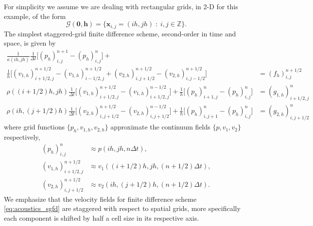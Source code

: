 For simplicity we assume we are dealing with rectangular grids, in 2-D for this example, of the form
\[
	\mathcal G(\mathbf 0,\mathbf h) = \{ \mathbf x_{i,j} = (ih,jh) \; : \; i,j\in\mathbb Z \}.
\]
The simplest staggered-grid finite difference scheme, second-order in time and space, is given by
\begin{equation}\label{eq:acoustics_sgfd}
\begin{split}
	\frac{1}{\kappa(ih,jh)} \frac{1}{\Delta t} \Big[  (p_h)^{n+1}_{i,j} - (p_h)^{n}_{i,j} \Big] + \hspace{7cm}\\
	\frac{1}{h} \Big[ (v_{1,h})_{i+1/2,j}^{n+1/2} - (v_{1,h})_{i-1/2,j}^{n+1/2} + 
				(v_{2,h})_{i,j+1/2}^{n+1/2} - (v_{2,h})_{i,j-1/2}^{n+1/2} \Big] 
		&= (f_h)^{n+1/2}_{i,j}\\
	\rho((i+1/2)h,jh) \frac{1}{\Delta t} \Big[ (v_{1,h})^{n+1/2}_{i+1/2,j} - (v_{1,h})^{n-1/2}_{i+1/2,j} \Big] +
	\frac{1}{h} \Big[ (p_h)_{i+1,j}^{n} - (p_h)_{i,j}^{n} \Big] 
		&= (g_{1,h})_{i+1/2,j}^{n}\\
	\rho(ih,(j+1/2)h) \frac{1}{\Delta t} \Big[ (v_{2,h})^{n+1/2}_{i,j+1/2} - (v_{2,h})^{n-1/2}_{i,j+1/2} \Big] +
	\frac{1}{h} \Big[ (p_h)_{i,j+1}^{n} - (p_h)_{i,j}^{n} \Big] 
		&= (g_{2,h})_{i,j+1/2}^{n}
\end{split}
\end{equation}
where grid functions $\{p_h,v_{1,h},v_{2,h}\}$ approximate the continuum fields $\{p,v_1,v_2\}$ respectively, %
\begin{equation*}
\begin{split}
	(p_h)_{i,j}^{n} &\approx p(ih,jh,n\Delta t), \\
	(v_{1,h})_{i+1/2,j}^{n+1/2} &\approx v_1((i+1/2)h,jh,(n+1/2)\Delta t),\\
	(v_{2,h})_{i,j+1/2}^{n+1/2} &\approx v_2(ih,(j+1/2)h,(n+1/2)\Delta t).
\end{split}
\end{equation*}
We emphasize that the velocity fields for finite difference scheme \ref{eq:acoustics_sgfd} are staggered with respect to spatial grids, more specifically each component is shifted by half a cell size in its respective axis.

